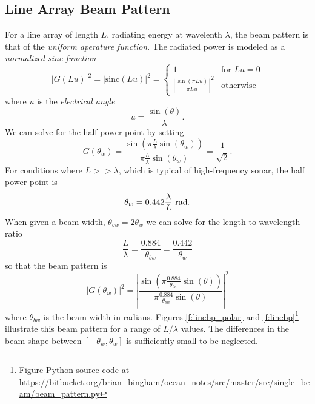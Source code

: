 \documentclass[11pt]{article}
\begin{document}
\subsection{Line Array Beam Pattern}
For a line array of length $L$, radiating energy at wavelenth $\lambda$, the beam pattern is that of the \emph{uniform aperature function}.  The radiated power is modeled as a \emph{normalized sinc function}
\begin{equation}
\left| G(L u) \right|^2 =  \left|\mathrm{sinc}(L u)\right|^2 = 
\begin{cases}
  1 & \text{for} \, \,  Lu = 0 \\
 \left| \frac{\sin(\pi L u)}{\pi L u} \right|^2  & \text{otherwise}
  \end{cases}
\end{equation}
where $u$ is the \emph{electrical angle}
\begin{equation}
u = \frac{\sin(\theta)}{\lambda}.
\end{equation}
We can solve for the half power point by setting
\begin{equation}
G(\theta_w) = \frac{\sin(\pi \frac{L}{\lambda} \sin(\theta_w))}{\pi \frac{L}{\lambda} \sin(\theta_w)} = \frac{1}{\sqrt{2}}.
\end{equation}
For conditions where $L >> \lambda$, which is typical of high-frequency sonar, the half power point is
\begin{equation}
\theta_{w} = 0.442 \frac{\lambda}{L} \,\, \unit[]{rad}.
\end{equation}
When given a beam width, $\theta_{bw} = 2 \theta_w$ we can solve for the length to wavelength ratio
\begin{equation}
\frac{L}{\lambda} = \frac{0.884}{\theta_{bw}} = \frac{0.442}{\theta_w}
\end{equation}
so that the beam pattern is
\begin{equation}
\left| G(\theta_w) \right|^2 = \left| \frac{\sin(\pi \frac{0.884}{\theta_{bw}} \sin(\theta))}{\pi \frac{0.884}{\theta_{bw}} \sin(\theta)} \right|^2
\end{equation}
where $\theta_{bw}$ is the beam width in radians.  Figures \ref{f:linebp_polar} and \ref{f:linebp}\footnote{Figure Python source code at \url{https://bitbucket.org/brian_bingham/ocean_notes/src/master/src/single_beam/beam_pattern.py}} illustrate this beam pattern for a range of $L/\lambda$ values.  The differences in the beam shape between $[-\theta_w,\theta_w]$ is sufficiently small to be neglected.
\end{document}
